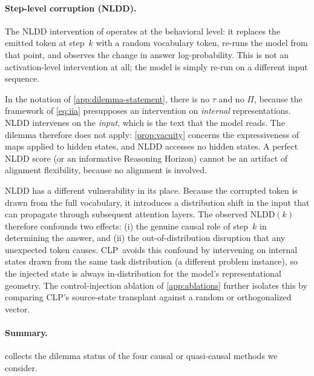 \documentclass[11pt]{article}
\newcommand{\stepk}{k}
\newcommand{\CLP}{\textsc{CLP}}
\begin{document}
\paragraph{Step-level corruption (NLDD).}
The NLDD intervention of \citet{DBLP:journals/corr/abs-2602-11201} operates
at the behavioral level: it replaces the emitted token at step~$\stepk$ with a
random vocabulary token, re-runs the model from that point, and observes the
change in answer log-probability. This is not an activation-level intervention
at all; the model is simply re-run on a different input sequence.

In the notation of \cref{app:dilemma-statement}, there is no $\tau$ and no
$\Pi$, because the framework of \cref{eq:iia} presupposes an intervention on
\emph{internal} representations. NLDD intervenes on the \emph{input}, which
is the text that the model reads. The dilemma therefore does not apply:
\cref{prop:vacuity} concerns the expressiveness of maps applied to hidden
states, and NLDD accesses no hidden states. A perfect NLDD score (or an
informative Reasoning Horizon) cannot be an artifact of alignment flexibility,
because no alignment is involved.

NLDD has a different vulnerability in its place. Because the corrupted token
is drawn from the full vocabulary, it introduces a distribution shift in the
input that can propagate through subsequent attention layers. The observed
$\mathrm{NLDD}(\stepk)$ therefore confounds two effects: (i) the genuine causal
role of step~$\stepk$ in determining the answer, and (ii) the out-of-distribution
disruption that any unexpected token causes. \CLP\ avoids this confound by
intervening on internal states drawn from the same task distribution (a
different problem instance), so the injected state is always in-distribution
for the model's representational geometry. The control-injection ablation of
\cref{app:ablations} further isolates this by comparing CLP's source-state
transplant against a random or orthogonalized vector.

\paragraph{Summary.}
 collects the dilemma status of the four causal or
quasi-causal methods we consider.
\end{document}
